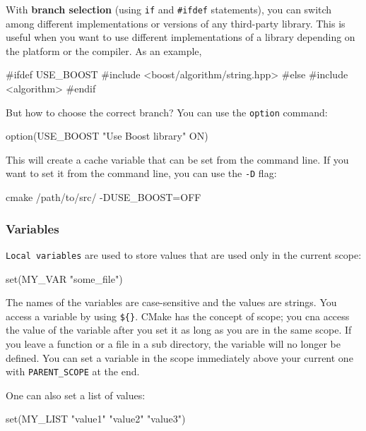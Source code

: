 With \textbf{branch selection} (using \texttt{if} and \texttt{\#ifdef} statements), you can switch among different implementations or versions of any third-party library. 
This is useful when you want to use different implementations of a library depending on the platform or the compiler. 
As an example, 
\begin{codeblock}[language=bash]
#ifdef USE_BOOST
    #include <boost/algorithm/string.hpp>
#else
    #include <algorithm>
#endif
\end{codeblock}

But how to choose the correct branch? You can use the \texttt{option} command:

\begin{codeblock}[language=bash]
option(USE_BOOST "Use Boost library" ON)
\end{codeblock}

This will create a cache variable that can be set from the command line. If you want to set it from the command line, you can use the \texttt{-D} flag:

\begin{codeblock}[language=bash]
cmake /path/to/src/ -DUSE_BOOST=OFF
\end{codeblock}


\subsubsection{Variables}

\texttt{Local variables} are used to store values that are used only in the current scope:

\begin{codeblock}[language=bash]
set(MY_VAR "some_file") 
\end{codeblock}

The names of the variables are case-sensitive and the values are strings. You access a variable by using \texttt{\$\{\}}.
CMake has the concept of scope; you cna access the value of the variable after you set it as long as you are in the same scope. If you leave a function or a file in a sub directory, the variable will 
no longer be defined. You can set a variable in the scope immediately above your current one with \texttt{PARENT\_SCOPE} at the end. 

One can also set a list of values:

\begin{codeblock}[language=bash]
set(MY_LIST "value1" "value2" "value3")
\end{codeblock}

